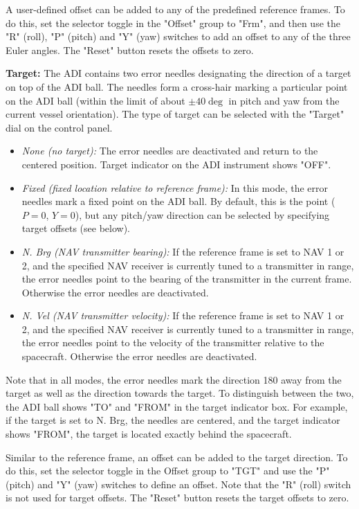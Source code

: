 \documentclass[Orbiter User Manual.tex]{subfiles}
\begin{document}
A user-defined offset can be added to any of the predefined reference frames. To
do this, set the selector toggle in the "Offset" group to "Frm", and then use
the "R" (roll), "P" (pitch) and "Y" (yaw) switches to add an offset to any of
the three Euler angles. The "Reset" button resets the offsets to zero.

\textbf{Target:}
The ADI contains two error needles designating the direction of a target on top
of the ADI ball. The needles form a cross-hair marking a particular point on the
ADI ball (within the limit of about $\pm 40\deg{}$ in pitch and yaw from the
current vessel orientation). The type of target can be selected with the
"Target" dial on the control panel.

\begin{itemize} 
	\item \emph{None (no target):} The error needles are deactivated and return
		to the centered position. Target indicator on the ADI instrument shows
		"OFF".
	\item \emph{Fixed (fixed location relative to reference frame):} In this
		mode, the error needles mark a fixed point on the ADI ball. By default,
		this is the point ($P = 0$, $Y = 0$), but any pitch/yaw direction can be
		selected by specifying target offsets (see below).
	\item \emph{N. Brg (NAV transmitter bearing):} If the reference frame is set
		to NAV 1 or 2, and the specified NAV receiver is currently tuned to a
		transmitter in range, the error needles point to the bearing of the
		transmitter in the current frame. Otherwise the error needles are
		deactivated.
	\item \emph{N. Vel (NAV transmitter velocity):} If the reference frame is
		set to NAV 1 or 2, and the specified NAV receiver is currently tuned to
		a transmitter in range, the error needles point to the velocity of the
		transmitter relative to the spacecraft. Otherwise the error needles are
		deactivated.
\end{itemize}

Note that in all modes, the error needles mark the direction 180\deg{} away from
the target as well as the direction towards the target. To distinguish between
the two, the ADI ball shows "TO" and "FROM" in the target indicator box. For
example, if the target is set to N. Brg, the needles are centered, and the
target indicator shows "FROM", the target is located exactly behind the
spacecraft.

Similar to the reference frame, an offset can be added to the target direction.
To do this, set the selector toggle in the Offset group to "TGT" and use the "P"
(pitch) and "Y" (yaw) switches to define an offset. Note that the "R" (roll)
switch is not used for target offsets. The "Reset" button resets the target
offsets to zero.
\end{document}
